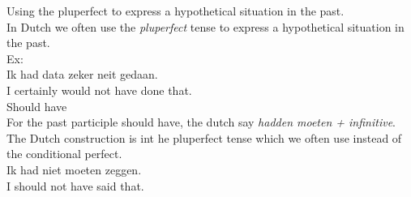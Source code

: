 \documentclass[letterpaper,11pt]{article}
\begin{document}
Using the pluperfect to express a hypothetical situation in the past. \\
In Dutch we often use the \textit{pluperfect} tense to express a hypothetical
situation in the past. \\
Ex:  \\
Ik had data zeker neit gedaan. \\ 
I certainly would not have done that. \\
Should have \\  
For the past participle should have, the dutch say \textit{hadden moeten +
infinitive}. The Dutch construction is int he pluperfect tense which we often
use instead of the conditional perfect. \\
Ik had niet moeten zeggen. \\
I should not have said that. \\
\end{document}
